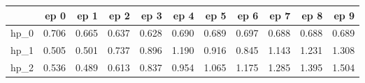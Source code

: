 \begin{tabular}{lrrrrrrrrrr}
\toprule
{} &   ep 0 &   ep 1 &   ep 2 &   ep 3 &   ep 4 &   ep 5 &   ep 6 &   ep 7 &   ep 8 &   ep 9 \\
\midrule
hp\_0 &  0.706 &  0.665 &  0.637 &  0.628 &  0.690 &  0.689 &  0.697 &  0.688 &  0.688 &  0.689 \\
hp\_1 &  0.505 &  0.501 &  0.737 &  0.896 &  1.190 &  0.916 &  0.845 &  1.143 &  1.231 &  1.308 \\
hp\_2 &  0.536 &  0.489 &  0.613 &  0.837 &  0.954 &  1.065 &  1.175 &  1.285 &  1.395 &  1.504 \\
\bottomrule
\end{tabular}
